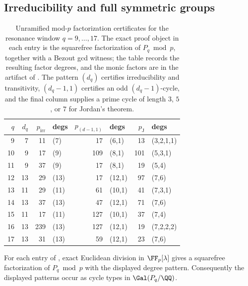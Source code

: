 ﻿\subsection{Irreducibility and full symmetric groups}

\begin{table}[t]
\centering
\scriptsize
\setlength{\tabcolsep}{5pt}
\caption{Unramified mod-\(p\) factorization certificates for the resonance
window \(q=9,\dots,17\).  The exact proof object in each entry is the
squarefree factorization of \(P_q\bmod p\), together with a Bezout gcd witness;
the table records the resulting factor degrees, and the monic factors are in
the artifact of .  The pattern
\((d_q)\) certifies irreducibility and
transitivity, \((d_q-1,1)\) certifies an odd \((d_q-1)\)-cycle, and the final
column supplies a prime cycle of length \(3\), \(5\), or \(7\) for Jordan's
theorem.}
\label{tab:galois-certificates-q9-17}
\begin{tabular}{r r r l r l r l}
\toprule
\(q\) & \(d_q\) & \(p_{\mathrm{irr}}\) & degs & \(p_{(d-1,1)}\) & degs & \(p_{\mathrm{J}}\) & degs\\
\midrule
9  & 7  & 11  & (7)  & 17  & (6,1)   & 13 & (3,2,1,1) \\
10 & 9  & 17  & (9)  & 109 & (8,1)   & 101 & (5,3,1) \\
11 & 9  & 37  & (9)  & 17  & (8,1)   & 19 & (5,4) \\
12 & 13 & 29  & (13) & 17  & (12,1)  & 97 & (7,6) \\
13 & 11 & 29  & (11) & 61  & (10,1)  & 41 & (7,3,1) \\
14 & 13 & 37  & (13) & 47  & (12,1)  & 71 & (7,6) \\
15 & 11 & 17  & (11) & 127 & (10,1)  & 37 & (7,4) \\
16 & 13 & 239 & (13) & 127 & (12,1)  & 19 & (7,2,2,2) \\
17 & 13 & 31  & (13) & 59  & (12,1)  & 23 & (7,6) \\
\bottomrule
\end{tabular}
\end{table}

\begin{lemma}
\label{lem:finite-field-certificate-soundness}
For each entry of , exact Euclidean
division in \(\FF_p[\lambda]\) gives a squarefree factorization of
\(P_q\bmod p\) with the displayed degree pattern.  Consequently the displayed
patterns occur as cycle types in \(\Gal(P_q/\QQ)\).
\end{lemma}


